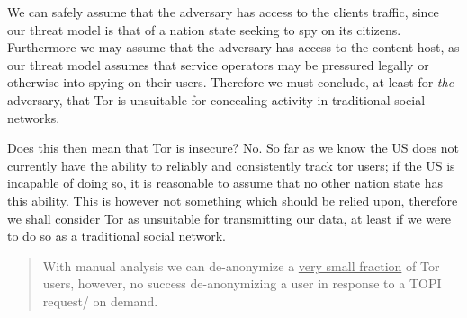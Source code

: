 We can safely assume that the adversary has access to the clients traffic, since
our threat model is that of a nation state seeking to spy on its citizens.
Furthermore we may assume that the adversary has access to the content host, as
our threat model assumes that service operators may be pressured legally or
otherwise into spying on their users. Therefore we must conclude, at least for
\textit{the} adversary, that Tor is unsuitable for concealing activity in
traditional social networks.

Does this then mean that Tor is insecure? No. So far as we know\cite{torStinks}
the US does not currently have the ability to reliably and consistently track
tor users; if the US is incapable of doing so, it is reasonable to assume that
no other nation state has this ability. This is however not something which
should be relied upon, therefore we shall consider Tor as unsuitable for
transmitting our data, at least if we were to do so as a traditional social
network.

\begin{quote}
With manual analysis we can de-anonymize a \uline{very small fraction} of Tor
users, however, no success de-anonymizing a user in response to a TOPI request/
on demand\cite{torStinks}.
\end{quote}
